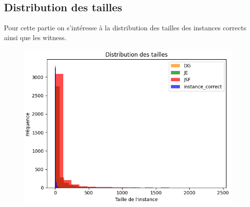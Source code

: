       \subsection{Distribution des tailles}
        Pour cette partie on s'intéresse à la distribution des tailles des instances corrects ainsi que les witness. 
        \begin{figure}[H]
          \centering
          \includegraphics[scale=0.7]{Photos/ted_vs_errors/distribution_tailles.PNG}
        \end{figure}
